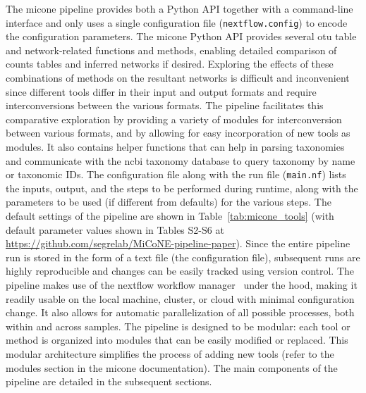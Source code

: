 \documentclass[letterpaper,12pt]{article}
\begin{document}
  The \ac{micone} pipeline provides both a Python API together with a command-line interface and only uses a single configuration file (\texttt{nextflow.config}) to encode the configuration parameters.
  The \ac{micone} Python API provides several \ac{otu} table and network-related functions and methods, enabling detailed comparison of counts tables and inferred networks if desired.
  Exploring the effects of these combinations of methods on the resultant networks is difficult and inconvenient since different tools differ in their input and output formats and require interconversions between the various formats.
  The pipeline facilitates this comparative exploration by providing a variety of modules for interconversion between various formats, and by allowing for easy incorporation of new tools as modules.
  It also contains helper functions that can help in parsing taxonomies and communicate with the \ac{ncbi} taxonomy database to query taxonomy by name or taxonomic IDs.
  The configuration file along with the run file (\texttt{main.nf}) lists the inputs, output, and the steps to be performed during runtime, along with the parameters to be used (if different from defaults) for the various steps.
  The default settings of the pipeline are shown in Table~\ref{tab:micone_tools} (with default parameter values shown in Tables S2-S6 at \href{https://github.com/segrelab/MiCoNE-pipeline-paper}{https://github.com/segrelab/MiCoNE-pipeline-paper}).
  Since the entire pipeline run is stored in the form of a text file (the configuration file), subsequent runs are highly reproducible and changes can be easily tracked using version control.
  The pipeline makes use of the nextflow workflow manager~\cite{Tommaso2015} under the hood, making it readily usable on the local machine, cluster, or cloud with minimal configuration change.
  It also allows for automatic parallelization of all possible processes, both within and across samples.
  The pipeline is designed to be modular: each tool or method is organized into modules that can be easily modified or replaced.
  This modular architecture simplifies the process of adding new tools (refer to the modules section in the \ac{micone} documentation).
  The main components of the pipeline are detailed in the subsequent sections.
\end{document}
